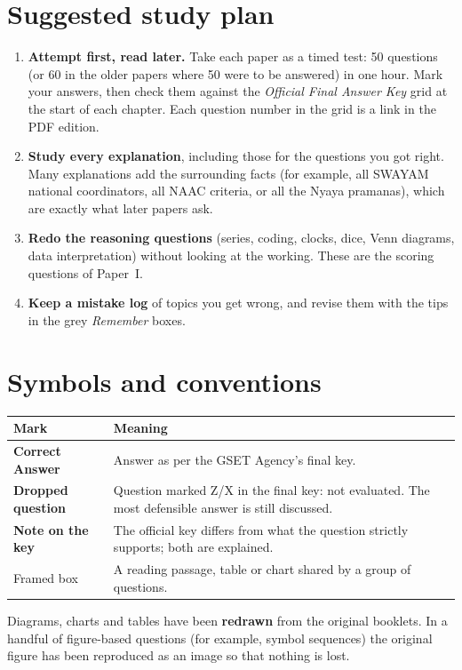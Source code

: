 \section*{Suggested study plan}
\begin{enumerate}
\item \textbf{Attempt first, read later.} Take each paper as a timed test: 50 questions (or 60 in the older papers where 50 were to be answered) in one hour. Mark your answers, then check them against the \emph{Official Final Answer Key} grid at the start of each chapter. Each question number in the grid is a link in the PDF edition.
\item \textbf{Study every explanation}, including those for the questions you got right. Many explanations add the surrounding facts (for example, all SWAYAM national coordinators, all NAAC criteria, or all the Nyaya pramanas), which are exactly what later papers ask.
\item \textbf{Redo the reasoning questions} (series, coding, clocks, dice, Venn diagrams, data interpretation) without looking at the working. These are the scoring questions of Paper~I.
\item \textbf{Keep a mistake log} of topics you get wrong, and revise them with the tips in the grey \emph{Remember} boxes.
\end{enumerate}

\section*{Symbols and conventions}
\begin{tabularx}{\linewidth}{@{}lX@{}}\toprule
\textbf{Mark} & \textbf{Meaning}\\\midrule
\colorbox{softgood}{\sffamily\small\color{good}\textbf{Correct Answer}} & Answer as per the GSET Agency's final key.\\[3pt]
\colorbox{soft}{\sffamily\small\color{accent}\textbf{Dropped question}} & Question marked Z/X in the final key: not evaluated. The most defensible answer is still discussed.\\[3pt]
{\sffamily\small\color{accent}\textbf{Note on the key}} & The official key differs from what the question strictly supports; both are explained.\\[3pt]
Framed box & A reading passage, table or chart shared by a group of questions.\\\bottomrule
\end{tabularx}

\medskip
Diagrams, charts and tables have been \textbf{redrawn} from the original booklets. In a handful of figure-based questions (for example, symbol sequences) the original figure has been reproduced as an image so that nothing is lost.
